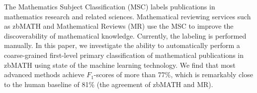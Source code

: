 The Mathematics Subject Classification (MSC) labels publications in mathematics research and related sciences.
Mathematical reviewing services such as zbMATH and Mathematical Reviews (MR) use the MSC to improve the discoverability of mathematical knowledge.
Currently, the labeling is performed manually.
In this paper, we investigate the ability to automatically perform a coarse-grained first-level primary classification of mathematical publications in zbMATH using state of the machine learning technology.
We find that most advanced methods achieve $F_1$-scores of more than 77\%, which is remarkably close to the human baseline of 81\% (the agreement of zbMATH and MR).